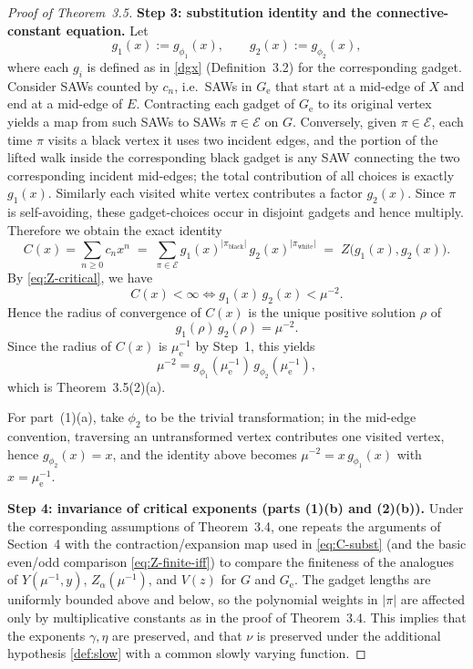 \documentclass[12pt]{amsart}
\theoremstyle{plain}
\numberwithin{equation}{section}
\numberwithin{theorem}{section}
\numberwithin{figure}{section}
\begin{document}
\begin{proof}[Proof of Theorem~3.5]
\medskip
\noindent\textbf{Step 3: substitution identity and the connective-constant equation.}
Let
\[
g_1(x):=g_{\phi_1}(x),\qquad g_2(x):=g_{\phi_2}(x),
\]
where each $g_i$ is defined as in \eqref{dgx} (Definition~3.2) for the corresponding gadget.
Consider SAWs counted by $c_n$, i.e.\ SAWs in $G_{\mathrm e}$ that start at a mid-edge of $X$
and end at a mid-edge of $E$.
Contracting each gadget of $G_{\mathrm e}$ to its original vertex yields a map from such SAWs
to SAWs $\pi\in\mathcal E$ on $G$.
Conversely, given $\pi\in\mathcal E$, each time $\pi$ visits a black vertex it uses two
incident edges, and the portion of the lifted walk inside the corresponding black gadget
is any SAW connecting the two corresponding incident mid-edges; the total contribution of
all choices is exactly $g_1(x)$.
Similarly each visited white vertex contributes a factor $g_2(x)$.
Since $\pi$ is self-avoiding, these gadget-choices occur in disjoint gadgets and hence multiply.
Therefore we obtain the exact identity
\begin{equation}\label{eq:C-subst}
C(x)=\sum_{n\ge0}c_n x^n \;=\;\sum_{\pi\in\mathcal E} g_1(x)^{|\pi_{\mathrm{black}}|}\,g_2(x)^{|\pi_{\mathrm{white}}|}
\;=\; Z\bigl(g_1(x),g_2(x)\bigr).
\end{equation}
By \eqref{eq:Z-critical}, we have
\[
C(x)<\infty \iff g_1(x)\,g_2(x)<\mu^{-2}.
\]
Hence the radius of convergence of $C(x)$ is the unique positive solution $\rho$ of
\[
g_1(\rho)\,g_2(\rho)=\mu^{-2}.
\]
Since the radius of $C(x)$ is $\mu_{\mathrm e}^{-1}$ by Step~1, this yields
\[
\mu^{-2}=g_{\phi_1}(\mu_{\mathrm e}^{-1})\,g_{\phi_2}(\mu_{\mathrm e}^{-1}),
\]
which is Theorem~3.5(2)(a).

For part~(1)(a), take $\phi_2$ to be the trivial transformation; in the mid-edge convention,
traversing an untransformed vertex contributes one visited vertex, hence $g_{\phi_2}(x)=x$,
and the identity above becomes $\mu^{-2}=x\,g_{\phi_1}(x)$ with $x=\mu_{\mathrm e}^{-1}$.

\medskip
\noindent\textbf{Step 4: invariance of critical exponents (parts (1)(b) and (2)(b)).}
Under the corresponding assumptions of Theorem~3.4, one repeats the arguments of
Section~4 with the contraction/expansion map used in \eqref{eq:C-subst} (and the basic
even/odd comparison \eqref{eq:Z-finite-iff}) to compare the finiteness of the analogues of
$Y(\mu^{-1},y)$, $Z_\alpha(\mu^{-1})$, and $V(z)$ for $G$ and $G_{\mathrm e}$.
The gadget lengths are uniformly bounded above and below, so the polynomial weights in
$|\pi|$ are affected only by multiplicative constants as in the proof of Theorem~3.4.
This implies that the exponents $\gamma,\eta$ are preserved, and that $\nu$ is preserved
under the additional hypothesis \eqref{def:slow} with a common slowly varying function.
\end{proof}
\end{document}
